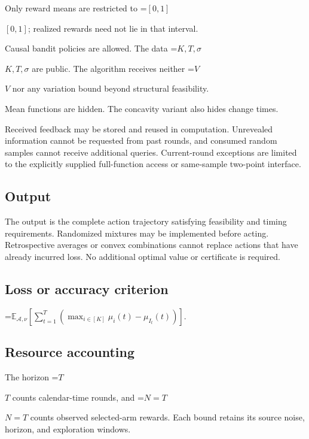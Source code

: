 \documentclass[10pt,a4paper]{article}
\newcommand{\AtlasMath}[1]{\par\begingroup\centering\setbox0=\hbox{$\displaystyle #1$}\ifdim\wd0>1.4\linewidth\typeout{ATLAS WIDE FORMULA: \the\wd0}\fi\ifdim\wd0>\linewidth\resizebox{\linewidth}{!}{\box0}\else\box0\fi\par\endgroup}
\newcommand{\AtlasInlineMath}[1]{\begingroup\setbox0=\hbox{$#1$}\ifdim\wd0>.4\linewidth\endgroup\AtlasMath{#1}\else\endgroup$#1$\fi}
\begin{document}
Only reward means are restricted to \AtlasInlineMath{[0,1]}; realized rewards need not lie in that interval.



Causal bandit policies are allowed. The data \AtlasInlineMath{K,T,\sigma} are public. The algorithm receives neither \AtlasInlineMath{V} nor any variation bound beyond structural feasibility.



Mean functions are hidden. The concavity variant also hides change times.



Received feedback may be stored and reused in computation. Unrevealed information cannot be requested from past rounds, and consumed random samples cannot receive additional queries. Current-round exceptions are limited to the explicitly supplied full-function access or same-sample two-point interface.



\subsection{Output}


The output is the complete action trajectory satisfying feasibility and timing requirements. Randomized mixtures may be implemented before acting. Retrospective averages or convex combinations cannot replace actions that have already incurred loss. No additional optimal value or certificate is required.



\subsection{Loss or accuracy criterion}



\AtlasMath{\mathbb{E}_{\mathcal{A},\nu}\!\left[\sum_{t=1}^{T}\left(\max_{i\in[K]}\mu_i(t)-\mu_{I_t}(t)\right)\right].}




\subsection{Resource accounting}


The horizon \AtlasInlineMath{T} counts calendar-time rounds, and \AtlasInlineMath{N=T} counts observed selected-arm rewards. Each bound retains its source noise, horizon, and exploration windows.
\end{document}
